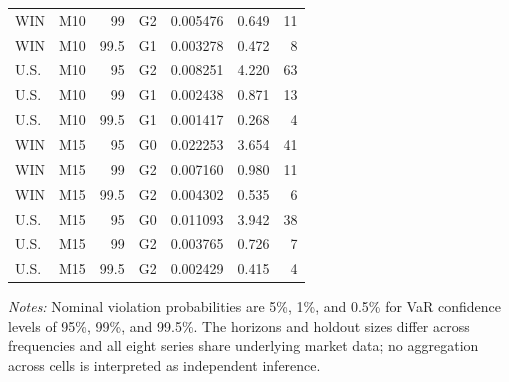\documentclass[11pt,a4paper]{article}
\begin{document}
\begin{longtable}{llrllrr}
WIN & M10 & 99 & G2 & 0.005476 & 0.649 & 11 \\ 
WIN & M10 & 99.5 & G1 & 0.003278 & 0.472 & 8 \\ 
U.S. & M10 & 95 & G2 & 0.008251 & 4.220 & 63 \\ 
U.S. & M10 & 99 & G1 & 0.002438 & 0.871 & 13 \\ 
U.S. & M10 & 99.5 & G1 & 0.001417 & 0.268 & 4 \\ 
WIN & M15 & 95 & G0 & 0.022253 & 3.654 & 41 \\ 
WIN & M15 & 99 & G2 & 0.007160 & 0.980 & 11 \\ 
WIN & M15 & 99.5 & G2 & 0.004302 & 0.535 & 6 \\ 
U.S. & M15 & 95 & G0 & 0.011093 & 3.942 & 38 \\ 
U.S. & M15 & 99 & G2 & 0.003765 & 0.726 & 7 \\ 
U.S. & M15 & 99.5 & G2 & 0.002429 & 0.415 & 4 \\ 
\bottomrule
\end{longtable}
\noindent\emph{Notes:} Nominal violation probabilities are 5\%, 1\%, and 0.5\% for VaR confidence levels of 95\%, 99\%, and 99.5\%. The horizons and holdout sizes differ across frequencies and all eight series share underlying market data; no aggregation across cells is interpreted as independent inference.
\end{document}
